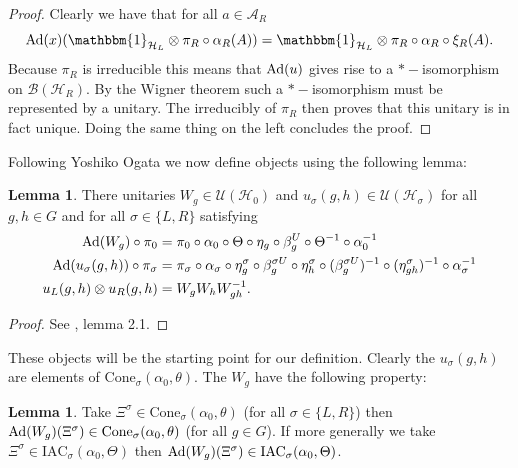 \documentclass[12pt,a4paper,twoside]{article}
\let\originalleft\left
\let\originalright\right
\renewcommand{\left}{\mathopen{}\mathclose\bgroup\originalleft}
\renewcommand{\right}{\aftergroup\egroup\originalright}
\newcommand{\UU}{\mathcal U}
\newcommand{\BB}{\mathcal B}
\newcommand{\HH}{\mathcal H}
\renewcommand{\AA}{\mathcal A}
\newcommand{\id}{\mathbbm{1}}
\newcommand{\Ad}[1]{\textrm{Ad}\left(#1\right)}
\theoremstyle{definition}
\newtheorem{lemma}[theorem]{Lemma}
\numberwithin{equation}{section}
\begin{document}
\begin{proof}
	Clearly we have that for all $a\in\AA_R$
	\begin{equation}
		\Ad{x}(\id_{\HH_L}\otimes \pi_R\circ\alpha_R(A))=\id_{\HH_L}\otimes \pi_R\circ\alpha_R\circ\xi_R(A).
	\end{equation}
	Because $\pi_R$ is irreducible this means that $\Ad{u}$ gives rise to a $*-$isomorphism on $\BB(\HH_R)$. By the Wigner theorem such a $*-$isomorphism must be represented by a unitary. The irreducibly of $\pi_R$ then proves that this unitary is in fact unique. Doing the same thing on the left concludes the proof.
\end{proof}
Following Yoshiko Ogata \cite{ogata2021h3gmathbb} we now define objects using the following lemma:
\begin{lemma}\label{lem:Definition_W_And_u}
	There unitaries $W_g\in\UU(\HH_0)$ and $u_{\sigma}(g,h)\in\UU(\HH_{\sigma})$ for all $g,h\in G$ and for all $\sigma\in\{L,R\}$ satisfying
	\begin{align}
		\Ad{W_g}\circ\pi_0&=\pi_0\circ\alpha_0\circ\Theta\circ\eta_g\circ\beta_g^U\circ\Theta^{-1}\circ\alpha_0^{-1}\\
		\Ad{u_\sigma(g,h)}\circ\pi_\sigma&=\pi_\sigma\circ\alpha_\sigma\circ\eta_g^\sigma\circ\beta_g^{\sigma U}\circ\eta_h^{\sigma}\circ(\beta_g^{\sigma U})^{-1}\circ(\eta^\sigma_{gh})^{-1}\circ\alpha_\sigma^{-1}\\
		u_L(g,h)\otimes u_R(g,h)&=W_gW_hW_{gh}^{-1}.
	\end{align}
\end{lemma}
\begin{proof}
	See \cite{ogata2021h3gmathbb}, lemma 2.1.
\end{proof}
These objects will be the starting point for our definition. Clearly the $u_\sigma(g,h)$ are elements of $\textrm{Cone}_\sigma(\alpha_0,\theta)$. The $W_g$ have the following property:
\begin{lemma}\label{lem:AdjointOverConeIsInCone}
	Take $\Xi^{\sigma}\in\textrm{Cone}_\sigma(\alpha_0,\theta)$ (for all $\sigma\in\{L,R\}$) then $\Ad{W_g}(\Xi^\sigma)\in\textrm{Cone}_\sigma(\alpha_0,\theta)$ (for all $g\in G$).	If more generally we take $\Xi^\sigma\in\textrm{IAC}_\sigma(\alpha_0,\Theta)$ then $\Ad{W_g}(\Xi^\sigma)\in\textrm{IAC}_\sigma(\alpha_0,\Theta)$.
\end{lemma}
\end{document}
